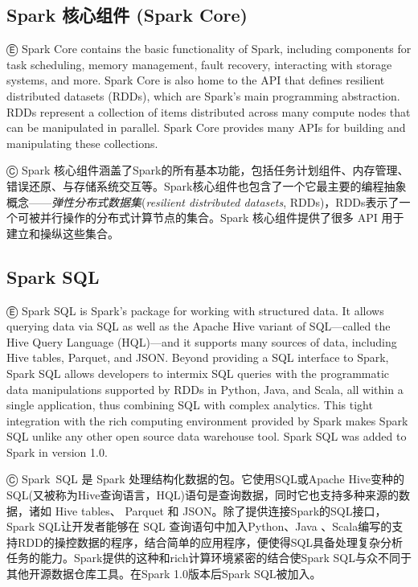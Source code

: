 \subsection{Spark 核心组件 (Spark Core)}\label{spark-core}

Ⓔ \textcolor{etc}{Spark Core contains the basic functionality of Spark, including components for task scheduling, memory management, fault recovery, interacting with storage systems, and more. Spark Core is also home to the API that defines resilient distributed datasets (RDDs), which are Spark's main programming abstraction. RDDs represent a collection of items distributed across many compute nodes that can be manipulated in parallel. Spark Core provides many APIs for building and manipulating these collections.}

Ⓒ Spark 核心组件涵盖了Spark的所有基本功能，包括任务计划组件、内存管理、错误还原、与存储系统交互等。Spark核心组件也包含了一个它最主要的编程抽象概念------\emph{弹性分布式数据集}(\emph{resilient distributed datasets}, RDDs)，RDDs表示了一个可被并行操作的分布式计算节点的集合。Spark 核心组件提供了很多 API 用于建立和操纵这些集合。

\subsection{Spark SQL}\label{spark-sql}

Ⓔ \textcolor{etc}{Spark SQL is Spark's package for working with structured data. It allows querying data via SQL as well as the Apache Hive variant of SQL---called the Hive Query Language (HQL)---and it supports many sources of data, including Hive tables, Parquet, and JSON. Beyond providing a SQL interface to Spark, Spark SQL allows developers to intermix SQL queries with the programmatic data manipulations supported by RDDs in Python, Java, and Scala, all within a single application, thus combining SQL with complex analytics. This tight integration with the rich computing environment provided by Spark makes Spark SQL unlike any other open source data warehouse tool. Spark SQL was added to Spark in version 1.0.}

Ⓒ Spark~SQL 是 Spark 处理结构化数据的包。它使用SQL或Apache Hive变种的SQL(又被称为Hive查询语言，HQL)语句是查询数据，同时它也支持多种来源的数据，诸如 Hive tables、 Parquet 和 JSON。除了提供连接Spark的SQL接口，Spark SQL让开发者能够在 SQL 查询语句中加入Python、Java 、Scala编写的支持RDD的操控数据的程序，结合简单的应用程序，便使得SQL具备处理复杂分析任务的能力。Spark提供的这种和rich计算环境紧密的结合使Spark SQL与众不同于其他开源数据仓库工具。在Spark 1.0版本后Spark SQL被加入。

